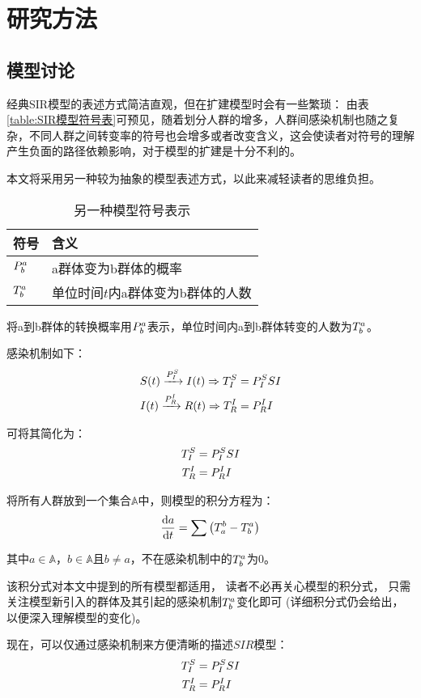 \section{研究方法}
\subsection{模型讨论}
\par 经典SIR模型的表述方式简洁直观，但在扩建模型时会有一些繁琐：
由表\ref{table:SIR模型符号表}可预见，随着划分人群的增多，人群间感染机制也随之复杂，不同人群之间转变率的符号也会增多或者改变含义，这会使读者对符号的理解产生负面的路径依赖影响，对于模型的扩建是十分不利的。
\par 本文将采用另一种较为抽象的模型表述方式，以此来减轻读者的思维负担。
\begin{table}[H]
    \centering
    \caption{另一种模型符号表示}
    \begin{tabular}{ll}
        \hline
        符号       & 含义                              \\
        \hline
        $\P{a}{b}$ & a群体变为b群体的概率              \\
        $\T{a}{b}$ & 单位时间$t$内a群体变为b群体的人数 \\
        \hline
    \end{tabular}
\end{table}
\par 将a到b群体的转换概率用$\P{a}{b}$表示，单位时间内a到b群体转变的人数为$\T{a}{b}$。
\par 感染机制如下：
\begin{align}
    S(t)\xrightarrow{\P{S}{I}}I(t) \Rightarrow \TP{S}{I}{SI} \\
    I(t)\xrightarrow{\P{I}{R}}R(t) \Rightarrow \TP{I}{R}{I}
\end{align}
\par 可将其简化为：
\begin{align}
    \TP{S}{I}{SI} \\
    \TP{I}{R}{I}
\end{align}
\par 将所有人群放到一个集合$\mathbb{A}$中，则模型的积分方程为：
\begin{equation}
    \dt{a} = \sum\left(\T{b}{a}-\T{a}{b}\right)
\end{equation}
\par 其中$a\in\mathbb{A}$，$b\in\mathbb{A}$且$b\not=a$，不在感染机制中的$\T{a}{b}$为$0$。
\par 该积分式对本文中提到的所有模型都适用，
读者不必再关心模型的积分式，
只需关注模型新引入的群体及其引起的感染机制$\T{a}{b}$变化即可
(详细积分式仍会给出，以便深入理解模型的变化)。
\par 现在，可以仅通过感染机制来方便清晰的描述$SIR$模型：
\begin{align}
    \TP{S}{I}{SI} \\
    \TP{I}{R}{I}
\end{align}
